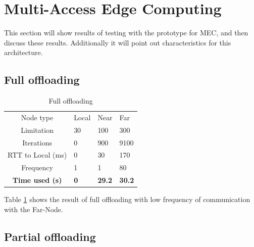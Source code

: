 

\section{Multi-Access Edge Computing} \label{section:MEC_evaluation}
This section will show results of testing with the prototype for MEC, and then discuss these results. Additionally it will point out characteristics for this architecture.

\subsection{Full offloading}




\begin{table}[h!]
    \centering
    \begin{tabular}[c]{c|p{2cm}p{2cm}p{2cm}}

        Node type & Local & Near & Far \\

        Limitation          & 30 & 100 & 300  \\

        Iterations          & 0 & 900 & 9100  \\

        RTT to Local (ms)   & 0 & 30 & 170 \\

        Frequency           & 1 & 1 & 80 \\

        \hline
        \textbf{Time used (s)}       & \textbf{0} & \textbf{29.2} & \textbf{30.2} \\

    \end{tabular}
    \caption{Full offloading}
    \label{tab:MEC_full_offloading_low_frequency}
\end{table}

Table \ref{tab:MEC_full_offloading_low_frequency} shows the result of full offloading with low frequency of communication with the Far-Node.






\subsection{Partial offloading}



